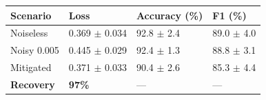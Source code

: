 \begin{tabular}{llll}
\toprule
Scenario & Loss & Accuracy (\%) & F1 (\%) \\
\midrule
Noiseless & 0.369 $\pm$ 0.034 & 92.8 $\pm$ 2.4 & 89.0 $\pm$ 4.0 \\
Noisy 0.005 & 0.445 $\pm$ 0.029 & 92.4 $\pm$ 1.3 & 88.8 $\pm$ 3.1 \\
Mitigated & 0.371 $\pm$ 0.033 & 90.4 $\pm$ 2.6 & 85.3 $\pm$ 4.4 \\
\textbf{Recovery} & \textbf{97\%} & --- & --- \\
\bottomrule
\end{tabular}

